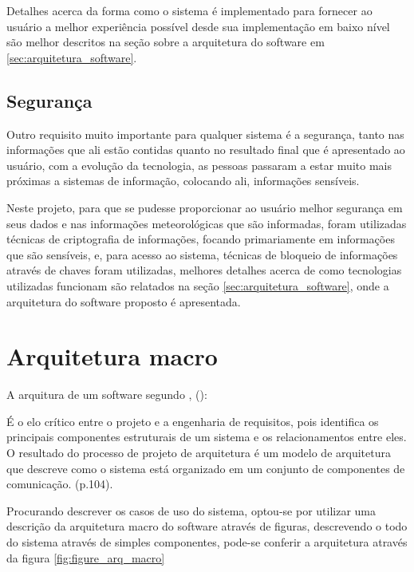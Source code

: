 Detalhes acerca da forma como o sistema é implementado para fornecer ao usuário a melhor experiência possível desde sua implementação em baixo nível são melhor descritos na seção sobre a arquitetura do software em \ref{sec:arquitetura_software}.

\subsection{Segurança}

Outro requisito muito importante para qualquer sistema é a segurança, tanto nas informações que ali estão contidas quanto no resultado final que é apresentado ao usuário, com a evolução da tecnologia, as pessoas passaram a estar muito mais próximas a sistemas de informação, colocando ali, informações sensíveis.

Neste projeto, para que se pudesse proporcionar ao usuário melhor segurança em seus dados e nas informações meteorológicas que são informadas, foram utilizadas técnicas de criptografia de informações, focando primariamente em informações que são sensíveis, e, para acesso ao sistema, técnicas de bloqueio de informações através de chaves foram utilizadas, melhores detalhes acerca de como tecnologias utilizadas funcionam são relatados na seção \ref{sec:arquitetura_software}, onde a arquitetura do software proposto é apresentada.

\section{Arquitetura macro}

A arquitura de um software segundo , (\citeyear{engenharia_software_sommerville}):

\begin{citacao}
    É o elo crítico entre o projeto e a engenharia de requisitos, pois identifica os principais componentes estruturais de um sistema e os relacionamentos entre eles. O resultado do processo de projeto de arquitetura é um modelo de arquitetura que descreve como o sistema está organizado em um conjunto de componentes de comunicação. (p.104).
\end{citacao}

Procurando descrever os casos de uso do sistema, optou-se por utilizar uma descrição da arquitetura macro do software através de figuras, descrevendo o todo do sistema através de simples componentes, pode-se conferir a arquitetura através da figura \ref{fig:figure_arq_macro}

